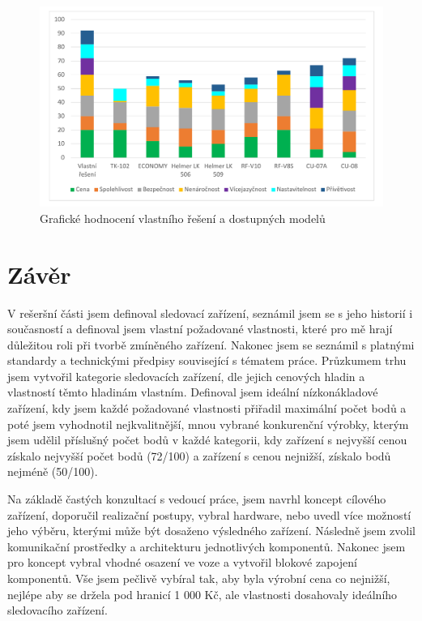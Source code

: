 \documentclass[FM,MP]{tulthesis}  %
\begin{document}
\begin{figure}[H]
\begin{center}
\includegraphics[width=\textwidth]{graphs/graf_bodoveHodnoceni_final.pdf}
\caption{Grafické hodnocení vlastního řešení a dostupných modelů}
\label{image}
\end{center}
\end{figure}


\chapter{Závěr}
V rešeršní části jsem definoval sledovací zařízení, seznámil jsem se s jeho historií i současností a definoval jsem vlastní požadované vlastnosti, které pro mě hrají důležitou roli při tvorbě zmíněného zařízení. Nakonec jsem se seznámil s platnými standardy a technickými předpisy související s tématem práce. Průzkumem trhu jsem vytvořil kategorie sledovacích zařízení, dle jejich cenových hladin a vlastností těmto hladinám vlastním. Definoval jsem ideální nízkonákladové zařízení, kdy jsem každé požadované vlastnosti přiřadil maximální počet bodů a poté jsem vyhodnotil nejkvalitnější, mnou vybrané konkurenční výrobky, kterým jsem udělil příslušný počet bodů v každé kategorii, kdy zařízení s nejvyšší cenou získalo nejvyšší počet bodů (72/100) a zařízení s cenou nejnižší, získalo bodů nejméně (50/100).

Na základě častých konzultací s vedoucí práce, jsem navrhl koncept cílového zařízení, doporučil realizační postupy, vybral hardware, nebo uvedl více možností jeho výběru, kterými může být dosaženo výsledného zařízení. Následně jsem zvolil komunikační prostředky a architekturu jednotlivých komponentů. Nakonec jsem pro koncept vybral vhodné osazení ve voze a vytvořil blokové zapojení komponentů. Vše jsem pečlivě vybíral tak, aby byla výrobní cena co nejnižší, nejlépe aby se držela pod hranicí 1 000 Kč, ale vlastnosti dosahovaly ideálního sledovacího zařízení.
\end{document}
